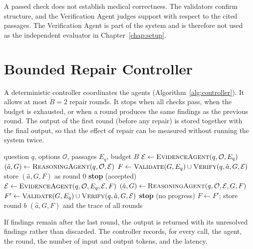 A passed check does not establish medical correctness. The validators confirm structure, and the Verification Agent judges support with respect to the cited passages. The Verification Agent is part of the system and is therefore not used as the independent evaluator in Chapter~\ref{chap:setup}.

\section{Bounded Repair Controller}
\label{sec:controller}

A deterministic controller coordinates the agents (Algorithm~\ref{alg:controller}). It allows at most $B = 2$ repair rounds. It stops when all checks pass, when the budget is exhausted, or when a round produces the same findings as the previous round. The output of the first round (before any repair) is stored together with the final output, so that the effect of repair can be measured without running the system twice.

\begin{algorithm}[H]
\caption{Bounded verification and repair for one question.}
\label{alg:controller}
\begin{algorithmic}[1]
\Require question $q$, options $\mathcal{O}$, passages $E_q$, budget $B$
\State $\mathcal{E} \gets \textsc{EvidenceAgent}(q, \mathcal{O}, E_q)$
\State $(\hat{a}, G) \gets \textsc{ReasoningAgent}(q, \mathcal{O}, \mathcal{E})$
\State $F \gets \textsc{Validate}(G, E_q) \cup \textsc{Verify}(q, \hat{a}, G, \mathcal{E})$
\State store $(\hat{a}, G, F)$ as round 0
   \State \textbf{stop} (accepted) \EndIf
     \State $\mathcal{E} \gets \textsc{EvidenceAgent}(q, \mathcal{O}, E_q, \mathcal{E}, F)$
  \EndIf
  \State $(\hat{a}, G) \gets \textsc{ReasoningAgent}(q, \mathcal{O}, \mathcal{E}, G, F)$
  \State $F' \gets \textsc{Validate}(G, E_q) \cup \textsc{Verify}(q, \hat{a}, G, \mathcal{E})$
   \State \textbf{stop} (no progress) \EndIf
  \State $F \gets F'$; store round $b$
\EndFor
\State \Return $(\hat{a}, G, F)$ and the trace of all rounds
\end{algorithmic}
\end{algorithm}

If findings remain after the last round, the output is returned with its unresolved findings rather than discarded. The controller records, for every call, the agent, the round, the number of input and output tokens, and the latency.

